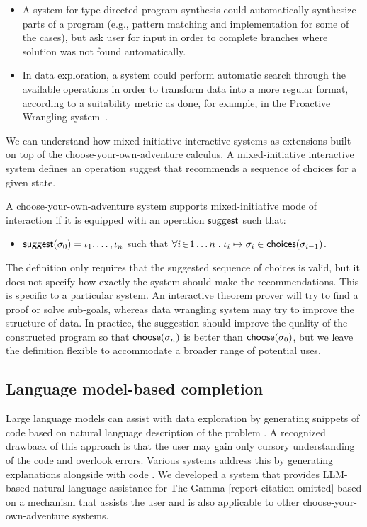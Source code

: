 \documentclass[a4paper,UKenglish,cleveref, autoref, thm-restate]{lipics-v2021}
\newcommand{\ident}[1]{\textsf{#1}}
\newcommand{\select}{\textnormal{\ident{choose}}}
\newcommand{\suggest}{\textnormal{\ident{suggest}}}
\newcommand{\choices}{\textnormal{\ident{choices}}}
\begin{document}
\begin{itemize}
\setlength{\itemsep}{5pt}
\item A system for type-directed program synthesis could automatically synthesize parts of a
  program (e.g., pattern matching and implementation for some of the cases), but ask user for
  input in order to complete branches where solution was not found automatically.
\item In data exploration, a system could perform automatic search through the available operations
  in order to transform data into a more regular format, according to a suitability
  metric as done, for example, in the Proactive Wrangling system~\cite{guo-2011-proactive}.
\end{itemize}

We can understand how mixed-initiative interactive systems as extensions
built on top of the choose-your-own-adventure calculus. A mixed-initiative interactive system
defines an operation \ident{suggest} that recommends a sequence of choices for a given state.

\begin{definition}
A choose-your-own-adventure system supports mixed-initiative mode of interaction if it is
equipped with an operation $\suggest$ such that:
\begin{itemize}
  \item $\suggest(\sigma_0)=\iota_1, \ldots, \iota_n$ such that
    $\forall i\!\in\! 1\ldots n\;.\;\iota_i\mapsto\sigma_i\in\choices(\sigma_{i-1})$.
\end{itemize}
\end{definition}

The definition only requires that the suggested sequence of choices is valid, but it
does not specify how exactly the system should make the recommendations. This is specific to
a particular system. An interactive theorem prover will try to find a proof or solve
sub-goals, whereas data wrangling system may try to improve the structure of data.
In practice, the suggestion should improve the quality of the constructed program so that
$\select(\sigma_n)$ is better than $\select(\sigma_0)$, but we leave the definition flexible
to accommodate a broader range of potential uses.

\newpage

\subsection{Language model-based completion}
Large language models can assist with data exploration by generating snippets of code based
on natural language description of the problem \cite{yin-2023-codegen}. A recognized drawback of
this approach is that the user may gain only cursory understanding of the code and overlook
errors. Various systems address this by generating explanations alongside with code \cite{nooralahzadeh-2024-data}.
We developed a system that provides LLM-based natural language assistance for The Gamma [report
citation omitted] based on a mechanism that assists the user and is also applicable to other
choose-your-own-adventure systems.
\end{document}
